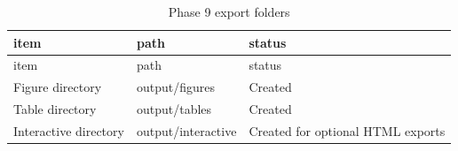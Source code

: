 \documentclass[
]{article}
\begin{document}
\begin{longtable}[]{@{}
  >{\raggedright\arraybackslash}p{}
  >{\raggedright\arraybackslash}p{}
  >{\raggedright\arraybackslash}p{}@{}}
\caption{Phase 9 export folders}\tabularnewline
\toprule\noalign{}
\begin{minipage}[b]{\linewidth}\raggedright
item
\end{minipage} & \begin{minipage}[b]{\linewidth}\raggedright
path
\end{minipage} & \begin{minipage}[b]{\linewidth}\raggedright
status
\end{minipage} \\
\midrule\noalign{}
\endfirsthead
\toprule\noalign{}
\begin{minipage}[b]{\linewidth}\raggedright
item
\end{minipage} & \begin{minipage}[b]{\linewidth}\raggedright
path
\end{minipage} & \begin{minipage}[b]{\linewidth}\raggedright
status
\end{minipage} \\
\midrule\noalign{}
\endhead
\bottomrule\noalign{}
\endlastfoot
Figure directory & output/figures & Created \\
Table directory & output/tables & Created \\
Interactive directory & output/interactive & Created for optional HTML
exports \\
\end{longtable}
\end{document}
